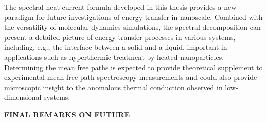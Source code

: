 The spectral heat current formula developed in this thesis provides a new paradigm for future investigations of energy transfer in nanoscale. Combined with the versatility of molecular dynamics simulations, the spectral decomposition can present a detailed picture of energy transfer processes in various systems, including, e.g., the interface between a solid and a liquid, important in applications such as hyperthermic treatment by heated nanoparticles. Determining the mean free paths is expected to provide theoretical supplement to experimental mean free path spectroscopy measurements and could also provide microscopic insight to the anomalous thermal conduction observed in low-dimensional systems.


\textbf{FINAL REMARKS ON FUTURE}



